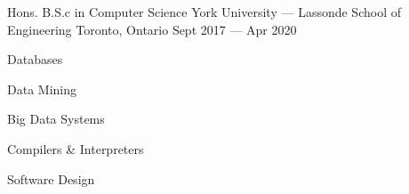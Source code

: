 

\begin{cventries}

  
  \cventry
    {Hons. B.S.c in Computer Science} %
    {York University — Lassonde School of Engineering} %
    {Toronto, Ontario} %
    {Sept 2017 — Apr 2020} %
    {
      \begin{cvitems} %
        \item {Databases}
        \item {Data Mining}
        \item {Big Data Systems}
        \item {Compilers \& Interpreters}
        \item {Software Design}
      \end{cvitems}
    }
    
  

\end{cventries}
